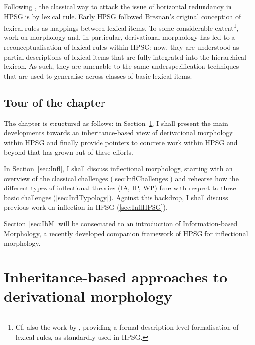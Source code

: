 Following \citet{Bresnan82}, the classical way to attack the issue of
horizontal redundancy in HPSG is by lexical rule. Early HPSG followed
Bresnan's original conception of lexical rules as mappings between
lexical items. To some considerable extent\footnote{Cf. also the work
  by \citet{meurers:towards,Meurers02}, providing a formal
  description-level formalisation of lexical rules, as standardly used
  in HPSG.}, work on morphology and, in particular, derivational
morphology has led to a reconceptualisation of lexical rules within
HPSG: now, they are understood as partial descriptions of lexical
items that are fully integrated into the hierarchical lexicon. As
such, they are amenable to the same underspecification techniques that
are used to generalise across classes of basic lexical items.

\subsection*{Tour of the chapter}

The chapter is structured as follows: in Section~\ref{sec:Deriv}, I
shall present the main developments towards an inheritance-based view
of derivational morphology within HPSG and finally provide pointers to
concrete work within HPSG and beyond that has grown out of
these efforts. 

In Section~\ref{sec:Infl}, I shall discuss inflectional morphology,
starting with an overview of the classical challenges
(\ref{sec:InflChallenges}) and rehearse how the different types of
inflectional theories (IA, IP, WP) fare with respect to these basic
challenges (\ref{sec:InflTypology}). Against this
backdrop, I shall  discuss previous work on inflection in HPSG (\ref{sec:InflHPSG}).  

Section~\ref{sec:IbM} will be consecrated to an introduction of
Information-based Morphology, a recently developed companion framework
of HPSG for inflectional morphology.



\section{Inheritance-based approaches to derivational morphology}
\label{sec:Deriv}

